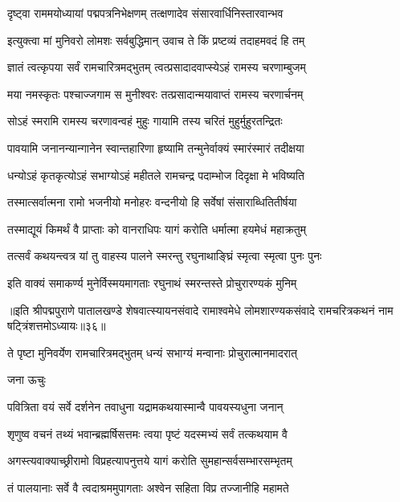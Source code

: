 \twolineshloka
{दृष्ट्वा राममयोध्यायां पद्मपत्रनिभेक्षणम्}
{तत्क्षणादेव संसारवार्धिनिस्तारवान्भव}%

\twolineshloka
{इत्युक्त्वा मां मुनिवरो लोमशः सर्वबुद्धिमान्}
{उवाच ते किं प्रष्टव्यं तदाहमवदं हि तम्}%

\twolineshloka
{ज्ञातं त्वत्कृपया सर्वं रामचारित्रमद्भुतम्}
{त्वत्प्रसादादवाप्स्येऽहं रामस्य चरणाम्बुजम्}%

\twolineshloka
{मया नमस्कृतः पश्चाज्जगाम स मुनीश्वरः}
{तत्प्रसादान्मयावाप्तं रामस्य चरणार्चनम्}%

\twolineshloka
{सोऽहं स्मरामि रामस्य चरणावन्वहं मुहुः}
{गायामि तस्य चरितं मुहुर्मुहुरतन्द्रितः}%

\twolineshloka
{पावयामि जनानन्यान्गानेन स्वान्तहारिणा}
{हृष्यामि तन्मुनेर्वाक्यं स्मारंस्मारं तदीक्षया}%

\twolineshloka
{धन्योऽहं कृतकृत्योऽहं सभाग्योऽहं महीतले}
{रामचन्द्र पदाम्भोज दिदृक्षा मे भविष्यति}%

\twolineshloka
{तस्मात्सर्वात्मना रामो भजनीयो मनोहरः}
{वन्दनीयो हि सर्वेषां संसाराब्धितितीर्षया}%

\twolineshloka
{तस्माद्यूयं किमर्थं वै प्राप्ताः को वानराधिपः}
{यागं करोति धर्मात्मा हयमेधं महाक्रतुम्}%

\twolineshloka
{तत्सर्वं कथयन्त्वत्र यां तु वाहस्य पालने}
{स्मरन्तु रघुनाथाङ्घ्रिं स्मृत्वा स्मृत्वा पुनः पुनः}%

\twolineshloka
{इति वाक्यं समाकर्ण्य मुनेर्विस्मयमागताः}
{रघुनाथं स्मरन्तस्ते प्रोचुरारण्यकं मुनिम्}%

॥इति श्रीपद्मपुराणे पातालखण्डे शेषवात्स्यायनसंवादे रामाश्वमेधे लोमशारण्यकसंवादे रामचरित्रकथनं नाम षट्त्रिंशत्तमोऽध्यायः॥३६॥



\twolineshloka
{ते पृष्टा मुनिवर्येण रामचारित्रमद्भुतम्}
{धन्यं सभाग्यं मन्वानाः प्रोचुरात्मानमादरात्}%

जना ऊचुः

\twolineshloka
{पवित्रिता वयं सर्वे दर्शनेन तवाधुना}
{यद्रामकथयास्मान्वै पावयस्यधुना जनान्}%

\twolineshloka
{शृणुष्व वचनं तथ्यं भवान्ब्रह्मर्षिसत्तमः}
{त्वया पृष्टं यदस्मभ्यं सर्वं तत्कथयाम वै}%

\twolineshloka
{अगस्त्यवाक्याच्छ्रीरामो विप्रहत्यापनुत्तये}
{यागं करोति सुमहान्सर्वसम्भारसम्भृतम्}%

\twolineshloka
{तं पालयानाः सर्वे वै त्वदाश्रममुपागताः}
{अश्वेन सहिता विप्र तज्जानीहि महामते}%

